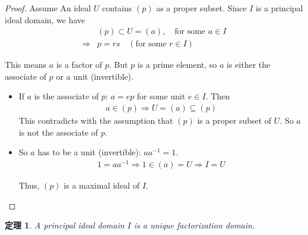 \documentclass[utf8]{ctexbook}
\newtheorem{theorem}{定理}[section]
\begin{document}
\begin{proof}

Assume An ideal $U$ contains $(p)$ as a proper subset. Since $I$ is a principal ideal domain, we have
\begin{align*}
& (p) \subset U = (a), \quad \mbox{for some } a \in I \\
\Longrightarrow & p = r s \quad (\mbox{for some }  r \in I)
\end{align*}

This means $a$ is a factor of $p$. But $p$ is a prime element, so $a$ is either the associate of $p$ or a unit (invertible).

\begin{itemize}
\item{If $a$ is the associate of $p$: $a = e p$ for some unit $e \in I$. Then
\begin{align*}
a \in (p) \Longrightarrow U = (a) \subseteq (p)
\end{align*}
This contradicts with the assumption that $(p)$ is a proper subset of $U$. So $a$ is not the associate of $p$.
}
\item{So $a$ has to be a unit (invertible): $a a^{-1} = 1$.
\begin{align*}
1 = a a^{-1} \Longrightarrow 1 \in (a) = U \Longrightarrow I = U
\end{align*}

Thus, $(p)$ is a maximal ideal of $I$.
}
\end{itemize}

\end{proof}


\begin{theorem}
\label{theorem_principal_ideal_domain_UFD}
A principal ideal domain $I$ is a unique factorization domain.
\end{theorem}
\end{document}
